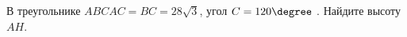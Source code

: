\begin{ex}
	\begin{condition}
		В треугольнике \(ABC AC=BC=28\sqrt{3} \), угол \( C =120\degree\) . Найдите высоту \( AH \).
	\end{condition}
\end{ex}
